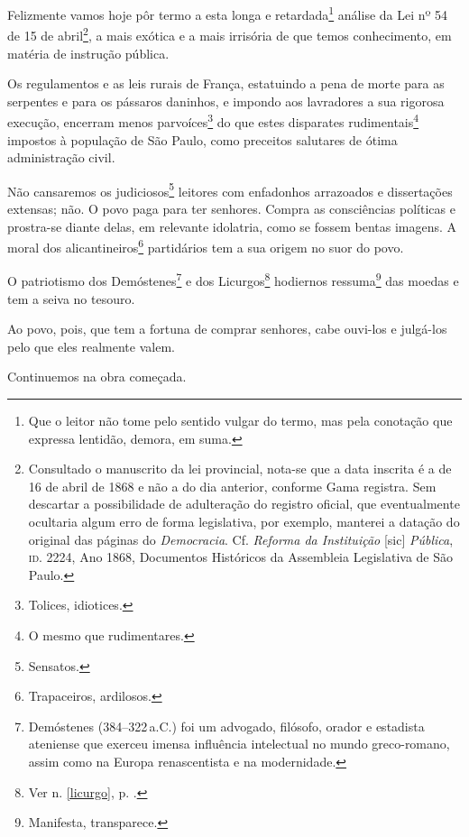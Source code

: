 Felizmente vamos hoje pôr termo a esta longa e retardada\footnote{Que
  o leitor não tome pelo sentido vulgar do termo, mas pela conotação que
  expressa lentidão, demora, em suma.} análise da Lei nº 54 de 15 de
abril\footnote{Consultado o manuscrito da lei provincial, nota-se que
  a data inscrita é a de 16 de abril de 1868 e não a do dia anterior, conforme
  Gama registra. Sem descartar a possibilidade de adulteração do
  registro oficial, que eventualmente ocultaria algum erro de forma
  legislativa, por exemplo, manterei a datação do original das páginas
  do \emph{Democracia}. Cf. \emph{Reforma da Instituição} {[}sic{]}
  \emph{Pública}, \textsc{id}. 2224, Ano 1868, Documentos Históricos da
  Assembleia Legislativa de São Paulo.}, a mais exótica e a mais
irrisória de que temos conhecimento, em matéria de instrução pública.

Os regulamentos e as leis rurais de França, estatuindo a pena de morte
para as serpentes e para os pássaros daninhos, e impondo aos lavradores
a sua rigorosa execução, encerram menos parvoíces\footnote{Tolices,
  idiotices.} do que estes disparates rudimentais\footnote{O mesmo que
  rudimentares.} impostos à população de São Paulo, como preceitos
salutares de ótima administração civil.

Não cansaremos os judiciosos\footnote{Sensatos.} leitores com
enfadonhos arrazoados e dissertações extensas; não. O povo paga para ter
senhores. Compra as consciências políticas e prostra-se diante delas, em
relevante idolatria, como se fossem bentas imagens. A moral dos
alicantineiros\footnote{Trapaceiros, ardilosos.} partidários tem a sua
origem no suor do povo.

O patriotismo dos Demóstenes\footnote{Demóstenes (384--322\,a.C.)
  foi um advogado, filósofo, orador e estadista ateniense que exerceu
  imensa influência intelectual no mundo greco-romano, assim como na
  Europa renascentista e na modernidade.} e dos Licurgos\footnote{Ver n. 
  \ref{licurgo}, p. \pageref{licurgo}.} hodiernos ressuma\footnote{Manifesta, 
  transparece.} das moedas e tem a seiva no tesouro.

Ao povo, pois, que tem a fortuna de comprar senhores, cabe ouvi-los e
julgá-los pelo que eles realmente valem.

Continuemos na obra começada.


